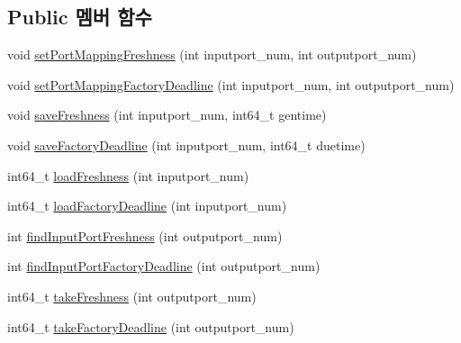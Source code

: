 \subsection*{Public 멤버 함수}
\begin{DoxyCompactItemize}
\item 
void \hyperlink{classConstraintPassingManager__PB_a8da0b01c95f6eb6991ed763bc7151a0f}{set\+Port\+Mapping\+Freshness} (int inputport\+\_\+num, int outputport\+\_\+num)
\item 
void \hyperlink{classConstraintPassingManager__PB_a05e635543ffe3a2cd25c26c348812d09}{set\+Port\+Mapping\+Factory\+Deadline} (int inputport\+\_\+num, int outputport\+\_\+num)
\item 
void \hyperlink{classConstraintPassingManager__PB_ab1569a1c4dc95157e77ac43eed44e28a}{save\+Freshness} (int inputport\+\_\+num, int64\+\_\+t gentime)
\item 
void \hyperlink{classConstraintPassingManager__PB_af9984e913275a946bf4c8fb772f49225}{save\+Factory\+Deadline} (int inputport\+\_\+num, int64\+\_\+t duetime)
\item 
int64\+\_\+t \hyperlink{classConstraintPassingManager__PB_aaea8253b7002edd6272ae4ee36617566}{load\+Freshness} (int inputport\+\_\+num)
\item 
int64\+\_\+t \hyperlink{classConstraintPassingManager__PB_a10289fbb94c1b7d943e46ff814090805}{load\+Factory\+Deadline} (int inputport\+\_\+num)
\item 
int \hyperlink{classConstraintPassingManager__PB_addd726c7327487a745c64086574c6888}{find\+Input\+Port\+Freshness} (int outputport\+\_\+num)
\item 
int \hyperlink{classConstraintPassingManager__PB_aaf738795807249b71091a9155a2a838d}{find\+Input\+Port\+Factory\+Deadline} (int outputport\+\_\+num)
\item 
int64\+\_\+t \hyperlink{classConstraintPassingManager__PB_adac2cc79ac0b3f68d7a066bbae35486f}{take\+Freshness} (int outputport\+\_\+num)
\item 
int64\+\_\+t \hyperlink{classConstraintPassingManager__PB_a560d29d55761fbc597b6a694722ae665}{take\+Factory\+Deadline} (int outputport\+\_\+num)
\end{DoxyCompactItemize}
